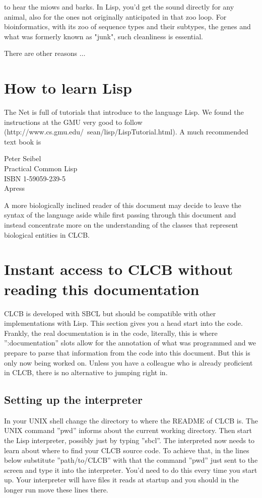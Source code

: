 \documentclass{book}
\begin{document}
to hear the miows and barks.  In Lisp, you'd get the sound directly for
any animal, also for the ones not originally anticipated in that zoo loop.
For bioinformatics, with its zoo of sequence types and their subtypes,
the genes and what was formerly known as "junk", such cleanliness is essential.

There are other reasons $\ldots$

\section{How to learn Lisp}

The Net is full of tutorials that introduce to the language
Lisp. We found the instructions at the GMU very good to follow
(http://www.cs.gmu.edu/~sean/lisp/LispTutorial.html). A much recommended
text book is

	Peter Seibel\\
	Practical Common Lisp\\
	ISBN 1-59059-239-5\\
	Apress

A more biologically inclined reader of this document may decide
to leave the syntax of the language aside while first passing through
this document and instead concentrate more on the understanding
of the classes that represent biological entities in CLCB.

\section{Instant access to CLCB without reading this documentation}

CLCB is developed with SBCL but should be compatible with other
implementations with Lisp. This section gives you a head start into the
code. Frankly, the real documentation is in the code, literally, this is
where '':documentation'' slots allow for the annotation of what was
programmed and we prepare to parse that information from the code into
this document. But this is only now being worked on.
Unless you have a colleague who is already proficient in CLCB, 
there is no alternative to jumping right in.

\subsection{Setting up the interpreter}

In your UNIX shell change the directory to where the README 
of CLCB is. The UNIX command ''pwd'' informs about the current
working directory. Then start the Lisp interpreter, possibly just
by typing ''sbcl''. The interpreted now needs to learn about 
where to find your CLCB source code. To achieve that, in the lines below
substitute ''path/to/CLCB'' with that the command ''pwd'' just sent to
the screen and type it into the interpreter. You'd need to do this
every time you start up. Your interpreter will have files it reads at
startup and you should in the longer run move these lines there.
\end{document}
